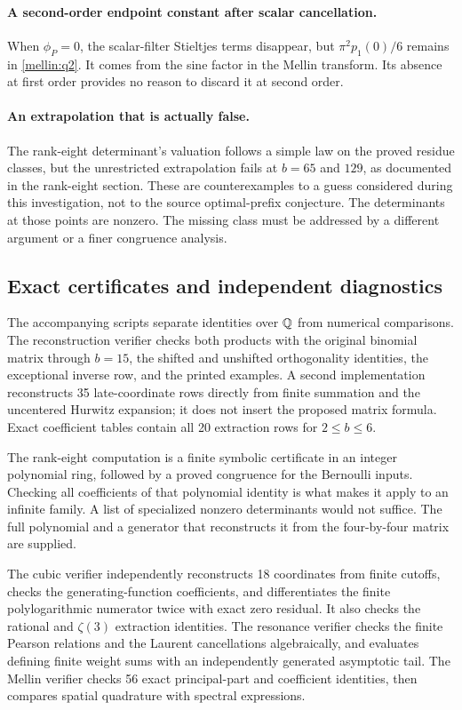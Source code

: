 \paragraph{A second-order endpoint constant after scalar cancellation.}
When $\phi_P=0$, the scalar-filter Stieltjes terms disappear, but
$\pi^2p_1(0)/6$ remains in \eqref{mellin:q2}. It comes from the sine
factor in the Mellin transform. Its absence at first order provides
no reason to discard it at second order.

\paragraph{An extrapolation that is actually false.}
The rank-eight determinant's valuation follows a simple law on the
proved residue classes, but the unrestricted extrapolation fails at
$b=65$ and $129$, as documented in the rank-eight section. These are
counterexamples to a guess considered during this investigation, not
to the source optimal-prefix conjecture. The determinants at those
points are nonzero. The missing class must be addressed by a different
argument or a finer congruence analysis.

\subsection{Exact certificates and independent diagnostics}

The accompanying scripts separate identities over $\mathbb Q$ from numerical
comparisons. The reconstruction verifier checks both products with the
original binomial matrix through $b=15$, the shifted and unshifted
orthogonality identities, the exceptional inverse row, and the printed
examples. A second implementation reconstructs 35 late-coordinate rows
directly from finite summation and the uncentered Hurwitz expansion;
it does not insert the proposed matrix formula. Exact coefficient tables
contain all 20 extraction rows for $2\le b\le6$.

The rank-eight computation is a finite symbolic certificate in an
integer polynomial ring, followed by a proved congruence for the Bernoulli
inputs. Checking all coefficients of that polynomial identity is what
makes it apply to an infinite family. A list of specialized nonzero
determinants would not suffice. The full polynomial and a generator that
reconstructs it from the four-by-four matrix are supplied.

The cubic verifier independently reconstructs 18 coordinates from finite
cutoffs, checks the generating-function coefficients, and differentiates
the finite polylogarithmic numerator twice with exact zero residual.
It also checks the rational and $\zeta(3)$ extraction identities.
The resonance verifier checks the finite Pearson relations and the
Laurent cancellations algebraically, and evaluates defining finite
weight sums with an independently generated asymptotic tail. The Mellin
verifier checks 56 exact principal-part and coefficient identities,
then compares spatial quadrature with spectral expressions.

